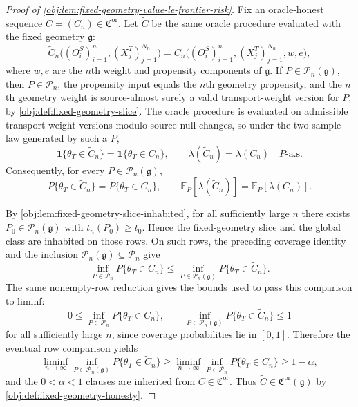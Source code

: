 \documentclass[11pt]{article}
\begin{document}
\begin{proof}[Proof of \cref{obj:lem:fixed-geometry-value-le-frontier-risk}]
Fix an oracle-honest sequence \(C=(C_n)\in\mathfrak C^{\mathrm{or}}\).  Let \(\widetilde C\) be the same oracle procedure evaluated with the fixed geometry \(\mathfrak g\):
\[
\widetilde C_n\bigl((O_i^S)_{i=1}^n,(X_j^T)_{j=1}^{N_n}\bigr)
=
C_n\bigl((O_i^S)_{i=1}^n,(X_j^T)_{j=1}^{N_n},w,e\bigr),
\]
where \(w,e\) are the \(n\)th weight and propensity components of \(\mathfrak g\).  If \(P\in\mathcal P_n(\mathfrak g)\), then \(P\in\mathcal P_n\), the propensity input equals the \(n\)th geometry propensity, and the \(n\)th geometry weight is source-almost surely a valid transport-weight version for \(P\), by \cref{obj:def:fixed-geometry-slice}.  The oracle procedure is evaluated on admissible transport-weight versions modulo source-null changes, so under the two-sample law generated by such a \(P\),
\[
\mathbf 1\{\theta_T\in \widetilde C_n\}=\mathbf 1\{\theta_T\in C_n\},
\qquad
\lambda(\widetilde C_n)=\lambda(C_n)
\quad P\text{-a.s.}
\]
Consequently, for every \(P\in\mathcal P_n(\mathfrak g)\),
\[
P\{\theta_T\in \widetilde C_n\}=P\{\theta_T\in C_n\},
\qquad
\mathbb E_P[\lambda(\widetilde C_n)]=\mathbb E_P[\lambda(C_n)].
\]

By \cref{obj:lem:fixed-geometry-slice-inhabited}, for all sufficiently large \(n\) there exists \(P_0\in\mathcal P_n(\mathfrak g)\) with \(t_n(P_0)\ge t_0\).  Hence the fixed-geometry slice and the global class are inhabited on those rows.  On such rows, the preceding coverage identity and the inclusion \(\mathcal P_n(\mathfrak g)\subseteq\mathcal P_n\) give
\[
\inf_{P\in\mathcal P_n}P\{\theta_T\in C_n\}
\le
\inf_{P\in\mathcal P_n(\mathfrak g)}P\{\theta_T\in \widetilde C_n\}.
\]
The same nonempty-row reduction gives the bounds used to pass this comparison to liminf:
\[
0\le \inf_{P\in\mathcal P_n}P\{\theta_T\in C_n\},
\qquad
\inf_{P\in\mathcal P_n(\mathfrak g)}P\{\theta_T\in \widetilde C_n\}\le 1
\]
for all sufficiently large \(n\), since coverage probabilities lie in \([0,1]\).  Therefore the eventual row comparison yields
\[
\liminf_{n\to\infty}
\inf_{P\in\mathcal P_n(\mathfrak g)}
P\{\theta_T\in \widetilde C_n\}
\ge
\liminf_{n\to\infty}
\inf_{P\in\mathcal P_n}
P\{\theta_T\in C_n\}
\ge 1-\alpha,
\]
and the \(0<\alpha<1\) clauses are inherited from \(C\in\mathfrak C^{\mathrm{or}}\).  Thus \(\widetilde C\in\mathfrak C^{\mathrm{or}}(\mathfrak g)\) by \cref{obj:def:fixed-geometry-honesty}. %


\end{proof}
\end{document}
